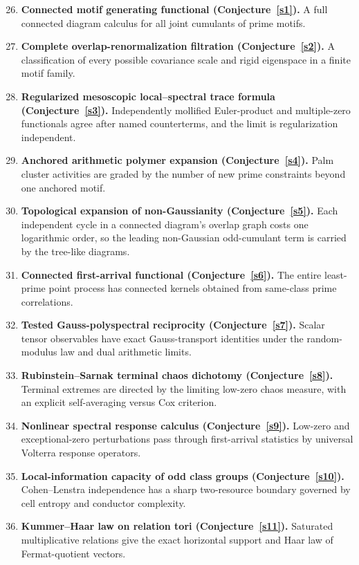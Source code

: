 \documentclass[11pt]{article}
\theoremstyle{definition}
\begin{document}
\begin{enumerate}
\setcounter{enumi}{25}
\item \textbf{Connected motif generating functional (Conjecture~\ref{s1}).}  A full connected diagram calculus for all joint cumulants of prime motifs.
\item \textbf{Complete overlap-renormalization filtration (Conjecture~\ref{s2}).}  A classification of every possible covariance scale and rigid eigenspace in a finite motif family.
\item \textbf{Regularized mesoscopic local--spectral trace formula (Conjecture~\ref{s3}).}  Independently mollified Euler-product and multiple-zero functionals agree after named counterterms, and the limit is regularization independent.
\item \textbf{Anchored arithmetic polymer expansion (Conjecture~\ref{s4}).}  Palm cluster activities are graded by the number of new prime constraints beyond one anchored motif.
\item \textbf{Topological expansion of non-Gaussianity (Conjecture~\ref{s5}).}  Each independent cycle in a connected diagram's overlap graph costs one logarithmic order, so the leading non-Gaussian odd-cumulant term is carried by the tree-like diagrams.
\item \textbf{Connected first-arrival functional (Conjecture~\ref{s6}).}  The entire least-prime point process has connected kernels obtained from same-class prime correlations.
\item \textbf{Tested Gauss-polyspectral reciprocity (Conjecture~\ref{s7}).}  Scalar tensor observables have exact Gauss-transport identities under the random-modulus law and dual arithmetic limits.
\item \textbf{Rubinstein--Sarnak terminal chaos dichotomy (Conjecture~\ref{s8}).}  Terminal extremes are directed by the limiting low-zero chaos measure, with an explicit self-averaging versus Cox criterion.
\item \textbf{Nonlinear spectral response calculus (Conjecture~\ref{s9}).}  Low-zero and exceptional-zero perturbations pass through first-arrival statistics by universal Volterra response operators.
\item \textbf{Local-information capacity of odd class groups (Conjecture~\ref{s10}).}  Cohen--Lenstra independence has a sharp two-resource boundary governed by cell entropy and conductor complexity.
\item \textbf{Kummer--Haar law on relation tori (Conjecture~\ref{s11}).}  Saturated multiplicative relations give the exact horizontal support and Haar law of Fermat-quotient vectors.

\end{enumerate}
\end{document}
